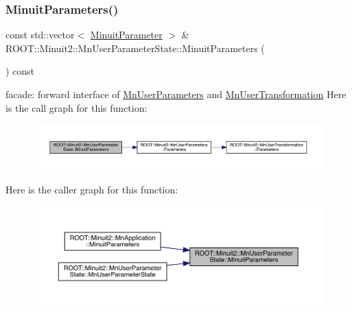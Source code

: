 \subsubsection{\texorpdfstring{MinuitParameters()}{MinuitParameters()}\hspace{0.1cm}{\footnotesize\ttfamily [3/3]}}
{\footnotesize\ttfamily const std\+::vector$<$ \mbox{\hyperlink{classROOT_1_1Minuit2_1_1MinuitParameter}{Minuit\+Parameter}} $>$ \& R\+O\+O\+T\+::\+Minuit2\+::\+Mn\+User\+Parameter\+State\+::\+Minuit\+Parameters (\begin{DoxyParamCaption}{ }\end{DoxyParamCaption}) const}

facade\+: forward interface of \mbox{\hyperlink{classROOT_1_1Minuit2_1_1MnUserParameters}{Mn\+User\+Parameters}} and \mbox{\hyperlink{classROOT_1_1Minuit2_1_1MnUserTransformation}{Mn\+User\+Transformation}} Here is the call graph for this function\+:
\nopagebreak
\begin{figure}[H]
\begin{center}
\leavevmode
\includegraphics[width=350pt]{d3/de0/classROOT_1_1Minuit2_1_1MnUserParameterState_aa9ad12f80ace3d55a1055b836293beec_cgraph}
\end{center}
\end{figure}
Here is the caller graph for this function\+:
\nopagebreak
\begin{figure}[H]
\begin{center}
\leavevmode
\includegraphics[width=350pt]{d3/de0/classROOT_1_1Minuit2_1_1MnUserParameterState_aa9ad12f80ace3d55a1055b836293beec_icgraph}
\end{center}
\end{figure}
\mbox{\label{classROOT_1_1Minuit2_1_1MnUserParameterState_a9bb4ce8eb968c5112c3e33a0b7a32609}} 
